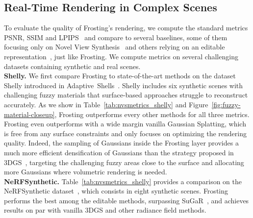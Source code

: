 \subsection{Real-Time Rendering in Complex Scenes}

To evaluate the quality of Frosting's rendering, we compute the standard metrics PSNR, SSIM and LPIPS~\cite{zhang-2018-cvpr-lpips} and compare to several baselines, some of them focusing only on Novel View Synthesis~\cite{mildenhall2020nerf,wang2021neus,barron2021mipnerf,barron2022mipnerf360,mueller2022instantngp,yu_and_fridovichkeil2021plenoxels,kerbl3Dgaussians} and others relying on an editable representation~\cite{chen2022mobilenerf,rakotosaona2023nerfmeshing,yariv-2023-bakedsdf,reiser2024binaryopacitygrid,wang-siggraphasia2023-adaptive-shells,guedon2023sugar}, just like Frosting. We compute metrics on several challenging datasets containing synthetic and real scenes.\\

\noindent
\textbf{Shelly.} We first compare Frosting to state-of-the-art methods on the dataset Shelly introduced in Adaptive~Shells~\cite{wang-siggraphasia2023-adaptive-shells}. Shelly includes six synthetic scenes with challenging fuzzy materials that surface-based approaches struggle to reconstruct accurately. As we show in Table~\ref{tab:nvsmetrics_shelly} and Figure~\ref{fig:fuzzy-material-closeup}, Frosting outperforms every other methods for all three metrics. Frosting even outperforms with a wide margin vanilla Gaussian Splatting, which is free from any surface constraints and only focuses on optimizing the rendering quality. Indeed, the sampling of Gaussians inside the Frosting layer provides a much more efficient densification of Gaussians than the strategy proposed in 3DGS~\cite{kerbl3Dgaussians}, targeting the challenging fuzzy areas close to the surface and allocating more Gaussians where volumetric rendering is needed.\\

\noindent
\textbf{NeRFSynthetic.} Table~\ref{tab:nvsmetrics_shelly} provides a comparison on the NeRFSynthetic data\-set~\cite{mildenhall2020nerf}, which consists in eight synthetic scenes. Frosting performs the best among the editable methods, surpassing Su\-GaR~\cite{guedon2023sugar}, and achieves results on par with vanilla 3DGS and other radiance field methods.\\



